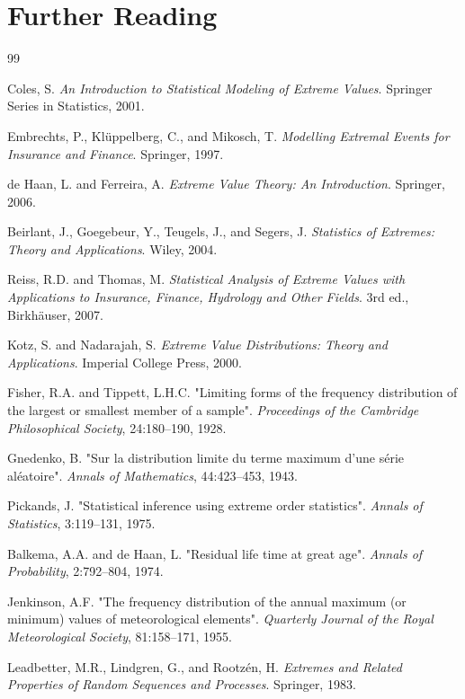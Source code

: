 \documentclass[a4paper, 11pt]{article}
\begin{document}
\section*{Further Reading}

\begin{thebibliography}{99}

 Coles, S. \textit{An Introduction to Statistical Modeling of Extreme
Values}. Springer Series in Statistics, 2001.

 Embrechts, P., Klüppelberg, C., and Mikosch, T. \textit{Modelling
Extremal Events for Insurance and Finance}. Springer, 1997.

 de Haan, L. and Ferreira, A. \textit{Extreme Value Theory: An
Introduction}. Springer, 2006.

 Beirlant, J., Goegebeur, Y., Teugels, J., and Segers, J.
\textit{Statistics of Extremes: Theory and Applications}. Wiley, 2004.

 Reiss, R.D. and Thomas, M. \textit{Statistical Analysis of Extreme
Values with Applications to Insurance, Finance, Hydrology and Other Fields}. 3rd ed.,
Birkhäuser, 2007.

 Kotz, S. and Nadarajah, S. \textit{Extreme Value Distributions:
Theory and Applications}. Imperial College Press, 2000.

 Fisher, R.A. and Tippett, L.H.C. "Limiting forms of the frequency
distribution of the largest or smallest member of a sample". \textit{Proceedings of the
Cambridge Philosophical Society}, 24:180--190, 1928.

 Gnedenko, B. "Sur la distribution limite du terme maximum d'une
série aléatoire". \textit{Annals of Mathematics}, 44:423--453, 1943.

 Pickands, J. "Statistical inference using extreme order statistics".
\textit{Annals of Statistics}, 3:119--131, 1975.

 Balkema, A.A. and de Haan, L. "Residual life time at great age".
\textit{Annals of Probability}, 2:792--804, 1974.

 Jenkinson, A.F. "The frequency distribution of the annual maximum
(or minimum) values of meteorological elements". \textit{Quarterly Journal of the Royal
Meteorological Society}, 81:158--171, 1955.

 Leadbetter, M.R., Lindgren, G., and Rootzén, H. \textit{Extremes
and Related Properties of Random Sequences and Processes}. Springer, 1983.


\end{thebibliography}
\end{document}
